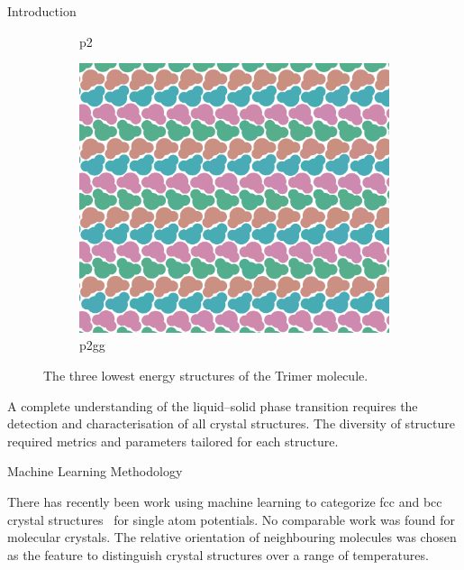 \documentclass{beamer}
\begin{document}
\begin{frame}[t]{}
\begin{columns}[t]
\begin{column}{0.47\linewidth}
\begin{block}{Introduction}
\begin{figure}[h]
\begin{subfigure}[t]{0.3\linewidth}
            \caption{p2}
            \label{fig:crystals p2}
          \end{subfigure}
          \begin{subfigure}[t]{0.3\linewidth}
              \includegraphics[width=\linewidth]{trimer-crys-p2gg}
            \caption{p2gg}
            \label{fig:crystals p2gg}
          \end{subfigure}
          \caption{The three lowest energy structures of the Trimer molecule.}
          \label{fig:crystals}
        \end{figure}
        A complete understanding of the liquid--solid phase transition requires
        the detection and characterisation of all crystal structures.
        The diversity of structure required metrics and parameters tailored for each structure.

      \end{block}

    \begin{block}{Machine Learning Methodology}

      There has recently been work using machine learning to
      categorize fcc and bcc crystal structures~\autocite{Reinhart2017,Dietz2017} for single atom
      potentials.
      No comparable work was found for molecular crystals.
      The relative orientation of neighbouring molecules was chosen as the feature
      to distinguish crystal structures over a range of temperatures.


\end{block}
\end{column}
\end{columns}
\end{frame}
\end{document}
